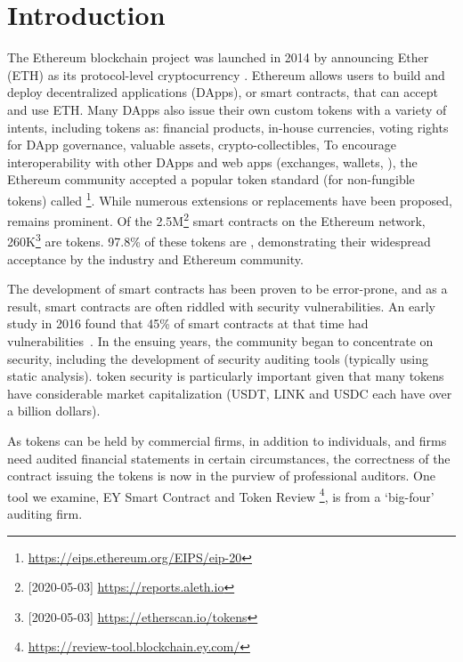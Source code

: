 
\section{Introduction}
\label{sect:introduction}

The Ethereum blockchain project was launched in 2014 by announcing Ether (ETH) as its protocol-level cryptocurrency \cite{EthGit,EIP150}. Ethereum allows users to build and deploy decentralized applications (DApps), or smart contracts, that can accept and use ETH. Many DApps also issue their own custom tokens with a variety of intents, including tokens as: financial products, in-house currencies, voting rights for DApp governance, valuable assets, crypto-collectibles, \etc To encourage interoperability with other DApps and web apps (exchanges, wallets, \etc), the Ethereum community accepted a popular token standard (for non-fungible tokens) called \erc\footnote{\url{https://eips.ethereum.org/EIPS/eip-20}}. While numerous \erc extensions or replacements have been proposed, \erc remains prominent. Of the 2.5M\footnote{[2020-05-03] \url{https://reports.aleth.io}} smart contracts on the Ethereum network, 260K\footnote{[2020-05-03] \url{https://etherscan.io/tokens}} are tokens. 97.8\% of these tokens are \erc\cite{EtherScan}, demonstrating their widespread acceptance by the industry and Ethereum community.

The development of smart contracts has been proven to be error-prone, and as a result, smart contracts are often riddled with security vulnerabilities. An early study in 2016 found that 45\% of smart contracts at that time had vulnerabilities~\cite{MakSm}. In the ensuing years, the community began to concentrate on security, including the development of security auditing tools (typically using static analysis). \erc token security is particularly important given that many tokens have considerable market capitalization (\eg USDT, LINK and USDC each have over a billion dollars). 

As tokens can be held by commercial firms, in addition to individuals, and firms need audited financial statements in certain circumstances, the correctness of the contract issuing the tokens is now in the purview of professional auditors. One tool we examine, EY Smart Contract and Token Review \footnote{\url{https://review-tool.blockchain.ey.com/}}, is from a `big-four' auditing firm. 

